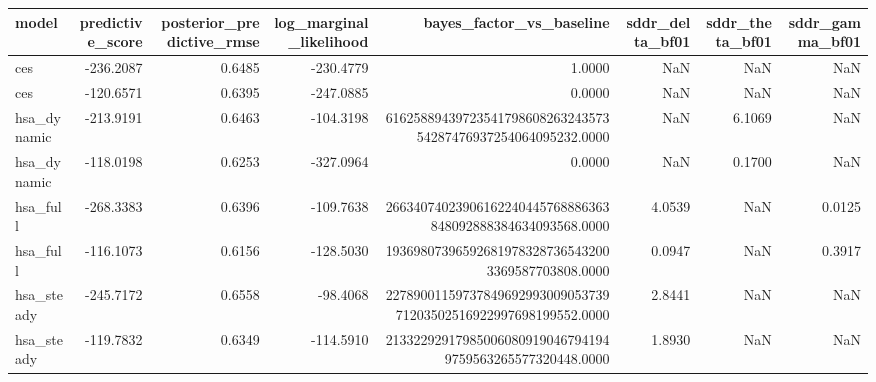 \begin{tabular}{lrrrrrrr}
\toprule
model & predictive\_score & posterior\_predictive\_rmse & log\_marginal\_likelihood & bayes\_factor\_vs\_baseline & sddr\_delta\_bf01 & sddr\_theta\_bf01 & sddr\_gamma\_bf01 \\
\midrule
ces & -236.2087 & 0.6485 & -230.4779 & 1.0000 & NaN & NaN & NaN \\
ces & -120.6571 & 0.6395 & -247.0885 & 0.0000 & NaN & NaN & NaN \\
hsa\_dynamic & -213.9191 & 0.6463 & -104.3198 & 6162588943972354179860826324357354287476937254064095232.0000 & NaN & 6.1069 & NaN \\
hsa\_dynamic & -118.0198 & 0.6253 & -327.0964 & 0.0000 & NaN & 0.1700 & NaN \\
hsa\_full & -268.3383 & 0.6396 & -109.7638 & 26634074023906162240445768886363848092888384634093568.0000 & 4.0539 & NaN & 0.0125 \\
hsa\_full & -116.1073 & 0.6156 & -128.5030 & 193698073965926819783287365432003369587703808.0000 & 0.0947 & NaN & 0.3917 \\
hsa\_steady & -245.7172 & 0.6558 & -98.4068 & 2278900115973784969299300905373971203502516922997698199552.0000 & 2.8441 & NaN & NaN \\
hsa\_steady & -119.7832 & 0.6349 & -114.5910 & 213322929179850060809190467941949759563265577320448.0000 & 1.8930 & NaN & NaN \\
\bottomrule
\end{tabular}
